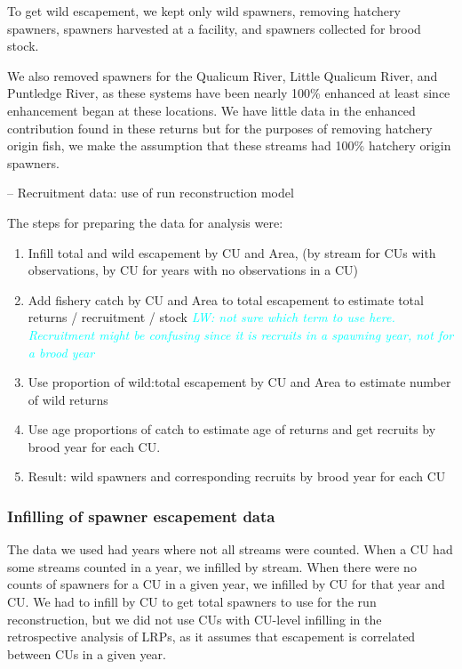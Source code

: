 \documentclass[11pt]{book}
\begin{document}
To get wild escapement, we kept only wild spawners, removing hatchery spawners, spawners harvested at a facility, and spawners collected for brood stock.

We also removed spawners for the Qualicum River, Little Qualicum River, and Puntledge River, as these systems have been nearly 100\% enhanced at least since enhancement began at these locations. We have little data in the enhanced contribution found in these returns but for the purposes of removing hatchery origin fish, we make the assumption that these streams had 100\% hatchery origin spawners.

-- Recruitment data: use of run reconstruction model

The steps for preparing the data for analysis were:
\begin{enumerate}
\def\labelenumi{\arabic{enumi}.}

\item
  Infill total and wild escapement by CU and Area, (by stream for CUs with observations, by CU for years with no observations in a CU)
\item
  Add fishery catch by CU and Area to total escapement to estimate total returns / recruitment / stock \emph{\textcolor{cyan}{LW: not sure which term to use here. Recruitment might be confusing since it is recruits in a spawning year, not for a brood year}}
\item
  Use proportion of wild:total escapement by CU and Area to estimate number of wild returns
\item
  Use age proportions of catch to estimate age of returns and get recruits by brood year for each CU.
\item
  Result: wild spawners and corresponding recruits by brood year for each CU
\end{enumerate}
\hypertarget{infilling-of-spawner-escapement-data}{%
\subsubsection{Infilling of spawner escapement data}\label{infilling-of-spawner-escapement-data}}

The data we used had years where not all streams were counted. When a CU had some streams counted in a year, we infilled by stream. When there were no counts of spawners for a CU in a given year, we infilled by CU for that year and CU. We had to infill by CU to get total spawners to use for the run reconstruction, but we did not use CUs with CU-level infilling in the retrospective analysis of LRPs, as it assumes that escapement is correlated between CUs in a given year.
\end{document}

